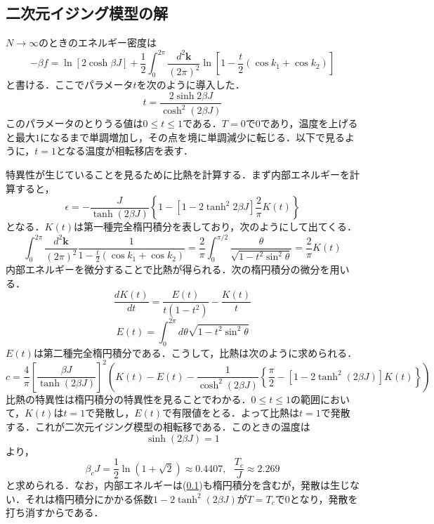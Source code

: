 \documentclass[a4paper,11pt]{jsarticle}
\begin{document}
\subsection{二次元イジング模型の解}
$N \rightarrow \infty$のときのエネルギー密度は
\begin{equation}
  -\beta f = \ln{[2 \cosh{\beta J}]} + \frac{1}{2} \int_{0}^{2\pi} \frac{d^2 \bm{k}}{(2 \pi)^2} \ln{\left[ 1 - \frac{t}{2}(\cos{k_1} + \cos{k_2}) \right]}
\end{equation}
と書ける．ここでパラメータ$t$を次のように導入した．
\begin{equation}
  t = \frac{2 \sinh{2\beta J}}{\cosh^2(2\beta J)}
\end{equation}
このパラメータのとりうる値は$0 \leq t \leq 1$である．$T=0$で$0$であり，温度を上げると最大$1$になるまで単調増加し，その点を境に単調減少に転じる．以下で見るように，$t=1$となる温度が相転移店を表す．\par
特異性が生じていることを見るために比熱を計算する．まず内部エネルギーを計算すると，
\begin{equation}
  \epsilon = -\frac{J}{\tanh{(2\beta J)}}\left\{1 - [1 - 2\tanh^2{2 \beta J}] \frac{2}{\pi} K(t) \right\}
\end{equation}
となる．$K(t)$は第一種完全楕円積分を表しており，次のようにして出てくる．
\begin{equation}
  \int_0^{2\pi} \frac{d^2 \bm{k}}{(2\pi)^2}\frac{1}{1 - \frac{t}{2}(\cos{k_1}+\cos{k_2})}
  =\frac{2}{\pi} \int_0^{\pi/2} \frac{\theta}{\sqrt{1 - t^2 \sin^2{\theta}}} = \frac{2}{\pi} K(t)
\end{equation}
内部エネルギーを微分することで比熱が得られる．次の楕円積分の微分を用いる．
\begin{equation}
  \frac{d K(t)}{dt} = \frac{E(t)}{t(1-t^2)} - \frac{K(t)}{t}
\end{equation}
\begin{equation}
  E(t) = \int_0^{2\pi} d\theta \sqrt{1 - t^2 \sin^2{\theta}}
\end{equation}
$E(t)$は第二種完全楕円積分である．こうして，比熱は次のように求められる．
\begin{equation}
  c = \frac{4}{\pi}\left[ \frac{\beta J}{\tanh{(2\beta J)}} \right]^2
  \left( K(t) - E(t) - \frac{1}{\cosh^2{(2\beta J)}} \left\{ \frac{\pi}{2} - [1 - 2\tanh^2{(2\beta J)}] K(t) \right\} \right)
\end{equation}
比熱の特異性は楕円積分の特異性を見ることでわかる．$0 \leq t \leq 1$の範囲において，$K(t)$は$t=1$で発散し，$E(t)$で有限値をとる．よって比熱は$t=1$で発散する．これが二次元イジング模型の相転移である．このときの温度は
\begin{equation}
  \sinh(2\beta J) = 1
\end{equation}
より，
\begin{equation}
  \beta_c J = \frac{1}{2} \ln(1+\sqrt{2}) \approx 0.4407, \ \ \ \frac{T_c}{J} \approx 2.269
\end{equation}
と求められる．なお，内部エネルギーは(\ref{})も楕円積分を含むが，発散は生じない．それは楕円積分にかかる係数$1-2\tanh^2(2\beta J)$が$T=T_c$で$0$となり，発散を打ち消すからである．
\end{document}
